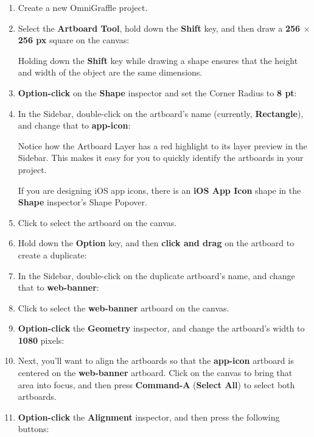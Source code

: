 \documentclass[../main.tex]{subfiles}
\begin{document}
\begin{enumerate}
  \item Create a new OmniGraffle project.
  \item Select the \textbf{Artboard Tool}, hold down the \textbf{Shift} key, and then draw a
    \textbf{256 $\times$ 256 px} square on the canvas:


    Holding down the \textbf{Shift} key while drawing a shape ensures that the height and width of
    the object are the same dimensions.
  \item \textbf{Option-click} on the \textbf{Shape} inspector and set the Corner Radius to
    \textbf{8 pt}:

  \item In the Sidebar, double-click on the artboard's name (currently, \textbf{Rectangle}), and
    change that to \textbf{app-icon}:


    Notice how the Artboard Layer has a red highlight to its layer preview in the Sidebar. This
    makes it easy for you to quickly identify the artboards in your project.

    \begin{ogtip}
      If you are designing iOS app icons, there is an \textbf{iOS App Icon} shape in the
      \textbf{Shape} inspector's Shape Popover.
    \end{ogtip}
  \item Click to select the artboard on the canvas.
  \item Hold down the \textbf{Option} key, and then \textbf{click and drag} on the artboard to
    create a duplicate:

  \item In the Sidebar, double-click on the duplicate artboard's name, and change that to
    \textbf{web-banner}:

  \item Click to select the \textbf{web-banner} artboard on the canvas.
  \item \textbf{Option-click} the \textbf{Geometry} inspector, and change the artboard's width
    to \textbf{1080} pixels:

  \item Next, you'll want to align the artboards so that the \textbf{app-icon} artboard is
    centered on the \textbf{web-banner} artboard. Click on the canvas to bring that area into
    focus, and then press \textbf{Command-A} (\textbf{Select All}) to select both artboards.
  \item \textbf{Option-click} the \textbf{Alignment} inspector, and then press the following
    buttons:


\end{enumerate}
\end{document}
